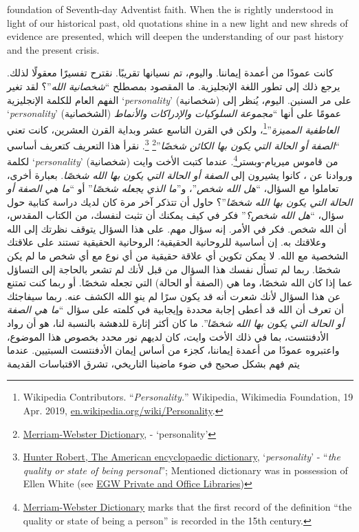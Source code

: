 foundation of Seventh-day Adventist faith. When the  is rightly understood in light of our historical past, old quotations shine in a new light and new shreds of evidence are presented, which will deepen the understanding of our past history and the present crisis.


كانت  عمودًا من أعمدة إيماننا. واليوم، تم نسيانها تقريبًا. نقترح تفسيرًا معقولًا لذلك. يرجع ذلك إلى تطور اللغة الإنجليزية. ما المقصود بمصطلح “\textit{شخصانية الله}”؟ لقد تغير الفهم العام للكلمة الإنجليزية ‘\textit{personality}’ (شخصانية) على مر السنين. اليوم، يُنظر إلى ‘\textit{personality}’ (الشخصانية) عمومًا على أنها “\textit{مجموعة السلوكيات والإدراكات والأنماط العاطفية المميزة}”\footnote{Wikipedia Contributors. “\textit{Personality.}” Wikipedia, Wikimedia Foundation, 19 Apr. 2019, \href{https://en.wikipedia.org/wiki/Personality}{en.wikipedia.org/wiki/Personality}.}، ولكن في القرن التاسع عشر وبداية القرن العشرين، كانت تعني “\textit{الصفة أو الحالة التي يكون بها الكائن شخصًا}”\footnote{\href{https://www.merriam-webster.com/dictionary/personality}{Merriam-Webster Dictionary}, - ‘personality’} \footnote{\href{https://babel.hathitrust.org/cgi/pt?id=mdp.39015050663213&view=1up&seq=780}{Hunter Robert, The American encyclopaedic dictionary}, ‘\textit{personality}’ - “\textit{the quality or state of being personal}”; Mentioned dictionary was in possession of Ellen White (see \href{https://repo.adventistdigitallibrary.org/PDFs/adl-22/adl-22251050.pdf?_ga=2.116010630.1065317374.1621993520-1506151612.1617862694&fbclid=IwAR3vwmp8jxtnpPEKv0KD9mCv8dJpmRGoyIXW0CkbQAjbU0h6YaBGqhgBzbk}{EGW Private and Office Libraries})}. نقرأ هذا التعريف كتعريف أساسي لكلمة ‘\textit{personality}’ (شخصانية) من قاموس ميريام-وبستر\footnote{\href{https://www.merriam-webster.com/dictionary/personality\#word-history}{Merriam-Webster Dictionary} marks that the first record of the definition “the quality or state of being a person” is recorded in the 15th century.}. عندما كتبت الأخت وايت وروادنا عن ، كانوا يشيرون إلى \textit{الصفة أو الحالة التي يكون بها الله شخصًا}. بعبارة أخرى، تعاملوا مع السؤال، “\textit{هل الله شخص}”، و”\textit{ما الذي يجعله شخصًا}” أو “\textit{ما هي الصفة أو الحالة التي يكون بها الله شخصًا}”؟ حاول أن تتذكر آخر مرة كان لديك دراسة كتابية حول سؤال، “\textit{هل الله شخص؟}” فكر في كيف يمكنك أن تثبت لنفسك، من الكتاب المقدس، أن الله شخص. فكر في الأمر. إنه سؤال مهم. على هذا السؤال يتوقف نظرتك إلى الله وعلاقتك به. إن  أساسية للروحانية الحقيقية؛ الروحانية الحقيقية تستند على علاقتك الشخصية مع الله. لا يمكن تكوين أي علاقة حقيقية من أي نوع مع أي شخص ما لم يكن شخصًا. ربما لم تسأل نفسك هذا السؤال من قبل لأنك لم تشعر بالحاجة إلى التساؤل عما إذا كان الله شخصًا، وما هي (الصفة أو الحالة) التي تجعله شخصًا. أو ربما كنت تمتنع عن هذا السؤال لأنك شعرت أنه قد يكون سرًا لم ينوِ الله الكشف عنه. ربما سيفاجئك أن تعرف أن الله قد أعطى إجابة محددة وإيجابية في كلمته على سؤال “\textit{ما هي الصفة أو الحالة التي يكون بها الله شخصًا}”. ما كان أكثر إثارة للدهشة بالنسبة لنا، هو أن رواد الأدفنتست، بما في ذلك الأخت وايت، كان لديهم نور محدد بخصوص هذا الموضوع، واعتبروه عمودًا من أعمدة إيماننا، كجزء من أساس إيمان الأدفنتست السبتيين. عندما يتم فهم  بشكل صحيح في ضوء ماضينا التاريخي، تشرق الاقتباسات القديمة 